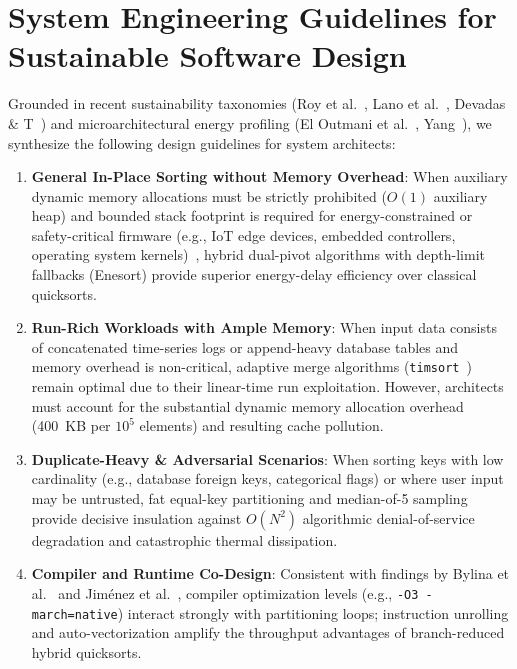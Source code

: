 \documentclass[journal]{IEEEtran}
\begin{document}
\section{System Engineering Guidelines for Sustainable Software Design}
Grounded in recent sustainability taxonomies (Roy et al.~\cite{roy2026taxonomy}, Lano et al.~\cite{lano2026model}, Devadas \& T~\cite{devadas2026carbon}) and microarchitectural energy profiling (El Outmani et al.~\cite{eloutmani2025energy}, Yang~\cite{yang2025holistic}), we synthesize the following design guidelines for system architects:
\begin{enumerate}
    \item \textbf{General In-Place Sorting without Memory Overhead}: When auxiliary dynamic memory allocations must be strictly prohibited ($O(1)$ auxiliary heap) and bounded stack footprint is required for energy-constrained or safety-critical firmware (e.g., IoT edge devices, embedded controllers, operating system kernels)~\cite{frigo2012cache}, hybrid dual-pivot algorithms with depth-limit fallbacks (Enesort) provide superior energy-delay efficiency over classical quicksorts.
    \item \textbf{Run-Rich Workloads with Ample Memory}: When input data consists of concatenated time-series logs or append-heavy database tables and memory overhead is non-critical, adaptive merge algorithms (\texttt{timsort}~\cite{peters2002timsort}) remain optimal due to their linear-time run exploitation. However, architects must account for the substantial dynamic memory allocation overhead (400~KB per $10^5$ elements) and resulting cache pollution.
    \item \textbf{Duplicate-Heavy \& Adversarial Scenarios}: When sorting keys with low cardinality (e.g., database foreign keys, categorical flags) or where user input may be untrusted, fat equal-key partitioning and median-of-5 sampling provide decisive insulation against $O(N^2)$ algorithmic denial-of-service degradation and catastrophic thermal dissipation.
    \item \textbf{Compiler and Runtime Co-Design}: Consistent with findings by Bylina et al.~\cite{bylina2025importance} and Jim\'enez et al.~\cite{jimenez2025compiler}, compiler optimization levels (e.g., \texttt{-O3 -march=native}) interact strongly with partitioning loops; instruction unrolling and auto-vectorization amplify the throughput advantages of branch-reduced hybrid quicksorts.
\end{enumerate}
\end{document}
